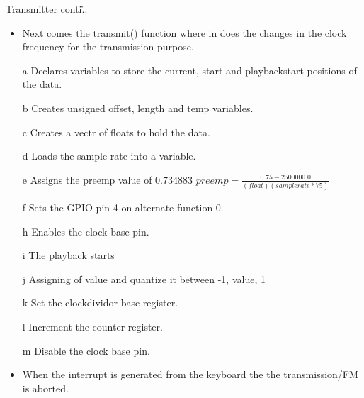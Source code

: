 \documentclass{beamer}
\begin{document}
\begin{frame}{Transmitter conti\...}
\begin{itemize}
\item Next comes the transmit() function where in does the changes in the clock frequency for the transmission purpose.
\item [a] Declares variables to store the current, start and playbackstart positions of the data.
\item[b] Creates unsigned offset, length and temp variables.
\item[c] Creates a vectr of floats to hold the data.
\item[d] Loads the sample-rate into a variable.
\item[e] Assigns the preemp value of 0.734883 $ preemp=\frac{0.75-2500000.0}{(float)(samplerate*75)} $
\item[f] Sets the GPIO pin 4 on alternate function-0.
\item[h] Enables the clock-base pin.
\item[i] The playback starts
\item[j] Assigning of value and quantize it between -1, value, 1
\item[k] Set the clockdividor base register.
\item[l] Increment the counter register.
\item[m] Disable the clock base pin.
\item When the interrupt is generated from the keyboard the the transmission/FM is aborted.
\end{itemize}
\end{frame}
\end{document}
